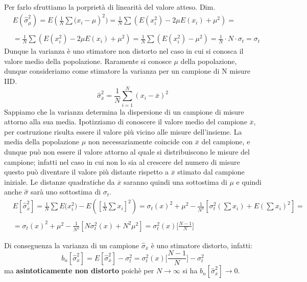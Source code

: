 \documentclass[11pt,a4paper]{book}
\begin{document}
\noindent Per farlo sfruttiamo la porpriet\`{a} di linearit\`{a} del valore atteso.
\newline
Dim.
\begin{align*}	
		& E(\hat{\sigma}_{\mu}^2) = E(\frac{1}{N} \sum{(x_{i}-\mu})^2) = \frac{1}{N}\sum(E(x_i^2) - 2\mu E(x_i)+\mu^2) =
		\\
		\\
		 & = \frac{1}{N}\sum(E(x_i^2) - 2\mu E(x_i)+\mu^2) = \frac{1}{N}\sum(E(x_i^2) -\mu^2) = \frac{1}{N} \cdot N \cdot \sigma_t = \sigma_t
\end{align*}
\newline
\noindent Dunque la varianza \`{e} uno stimatore non distorto nel caso in cui si conosca il valore medio della popolazione. Raramente si conosce $\mu$ della popolazione, dunque consideriamo come stimatore la varianza per un campione di N misure IID.
\begin{equation*}
	\hat{\sigma}_{\overline{x}}^2 = \dfrac{1}{N}\sum_{i=1}^N(x_i - \overline{x})^2	
\end{equation*}
\newline
\noindent Sappiamo che la varianza determina la dispersione di un campione di misure attorno alla sua media. Ipotizziamo di conoscere il valore medio del campione $\overline{x}$, per costruzione risulta essere il valore pi\`{u} vicino alle misure dell'insieme. La media della popolazione $\mu$ non necessariamente coincide con $\overline{x}$ del campione, e dunque pu\`{o} non essere il valore attorno al quale si distribuiscono le misure del campione; infatti nel caso in cui non lo sia al crescere del numero di misure questo pu\`{o} diventare il valore pi\`{u} distante rispetto a $\overline{x}$ stimato dal campione iniziale. Le distanze quadratiche da  $\overline{x}$ saranno quindi una sottostima di $\mu$ e quindi anche $\hat{\sigma}$ sar\`{a} uno sottostima di $\sigma_t$.  
 \begin{align*}
		&E[\hat{\sigma}_{\overline{x}}^2] = \frac{1}{N} \sum{E(x_{i}^2}) - E([\frac{1}{N}\sum{x}_{i}]^2) = \sigma_{t}(x)^2 + \mu^2 - \frac{1}{N^2}[\sigma_{t}^2(\sum{x_{i}}) + E(\sum{x_{i}})^2] = 
		\\
		\\
		&= \sigma_{t}(x)^2 + \mu^2 - \frac{1}{N^2}[N\sigma_{t}^2(x) + N^2 \mu^2] = \sigma_{t}^2(x) \Big[\frac{N-1}{N} \Big ] 
\end{align*}
 
\noindent Di conseguenza la varianza di un campione $\hat{\sigma}_{\overline{x}}$ \`{e} uno stimatore distorto, infatti:
\begin{equation*}
	b_n[\hat{\sigma}_{\overline{x}}^2] = E[\hat{\sigma}_{\overline{x}}^2] - \sigma_{t}^2 = \sigma_{t}^2(x) \Big[\frac{N-1}{N} \Big ] - \sigma_{t}^2 
\end{equation*}
ma \textbf{asintoticamente non distorto} poich\`{e} per $N \rightarrow \infty $ si ha $b_n[\hat{\sigma}_{\overline{x}}^2] \rightarrow 0$.
\newline
\end{document}
